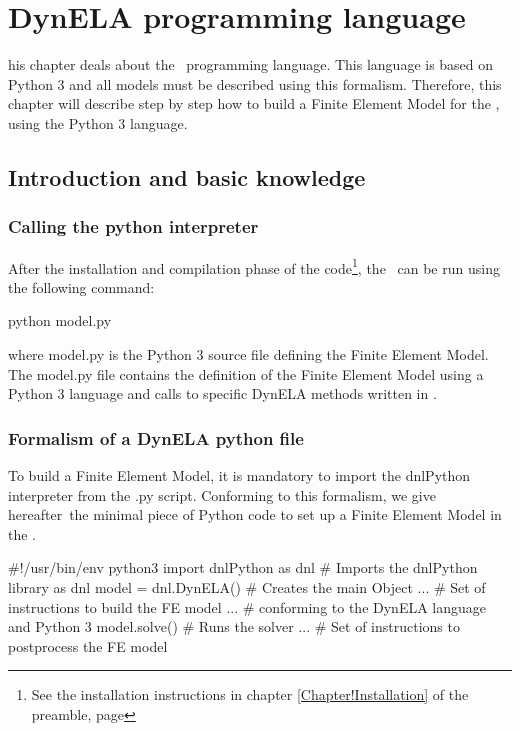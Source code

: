 %
%
%
\chapter{DynELA programming language}

\startcontents[chapters]
\printmyminitoc[1]his chapter deals about the \DynELA~programming language. This language is based on Python 3 and all models must be described using this formalism. Therefore, this chapter will describe step by step how to build a Finite Element Model for the \DynELA, using the Python 3 language.

\section{Introduction and basic knowledge}

\subsection{Calling the python interpreter}

After the installation and compilation phase of the code\footnote{See the installation instructions in chapter \ref{Chapter!Installation} of the preamble, page \pageref{Chapter!Installation}}, the \DynELA~can be run using the following command:

\begin{BashListing}
python model.py
\end{BashListing}

where \textsf{model.py} is the Python 3 source file defining the Finite Element Model. The \textsf{model.py} file contains the definition of the Finite Element Model using a Python 3 language and calls to specific DynELA methods written in \Cpp.

\subsection{Formalism of a DynELA python file}

To build a Finite Element Model, it is mandatory to import the \textsf{dnlPython} interpreter from the \textsf{.py} script. Conforming to this formalism, we give hereafter the minimal piece of Python code to set up a Finite Element Model in the \DynELA.

\begin{PythonListing}
#!/usr/bin/env python3
import dnlPython as dnl # Imports the dnlPython library as dnl
model = dnl.DynELA()    # Creates the main Object
...                     # Set of instructions to build the FE model
...                     # conforming to the DynELA language and Python 3
model.solve()           # Runs the solver
...                     # Set of instructions to postprocess the FE model
\end{PythonListing}

